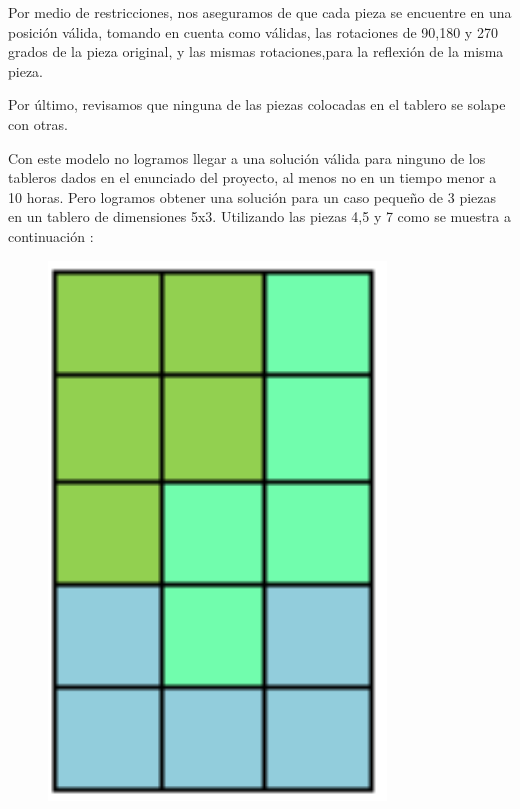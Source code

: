 \documentclass{article}
\begin{document}
Por medio de restricciones, nos aseguramos de que cada pieza se encuentre en una posición válida, tomando en cuenta como válidas, las rotaciones de 90,180 y 270 grados de la pieza original, y las mismas rotaciones,para la reflexión de la misma pieza. \par


Por último, revisamos que ninguna de las piezas colocadas en el tablero se solape con otras. \par

Con este modelo no logramos llegar a una solución válida para ninguno de los tableros dados en el enunciado del proyecto, al menos no en un tiempo menor a 10 horas. Pero logramos obtener una solución para un caso pequeño de 3 piezas en un tablero de dimensiones 5x3. Utilizando las piezas 4,5 y 7 como se muestra a continuación : \par

\begin{figure}[!ht]
\begin{center}
\includegraphics[width=0.8\textwidth]{salida5.png}
\end{center}
\end{figure}
\end{document}
